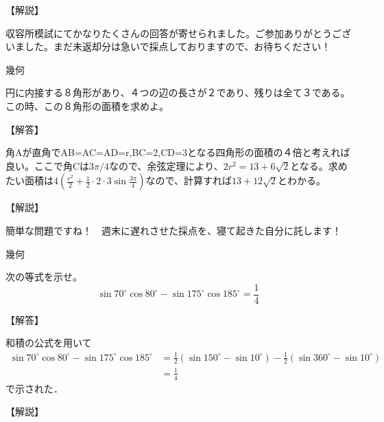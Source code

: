 \documentclass[a4paper,fleqn,dvipdfmx]{jsarticle}
\begin{document}
\begin{flushleft}
【解説】
\end{flushleft}

    収容所模試にてかなりたくさんの回答が寄せられました。ご参加ありがとうございました。まだ未返却分は急いで採点しておりますので、お待ちください！



\newpage


\begin{itembox}[l]{幾何}

    円に内接する８角形があり、４つの辺の長さが２であり、残りは全て３である。この時、この８角形の面積を求めよ。
    
\end{itembox}


\begin{flushleft}
【解答】
\end{flushleft}

    角Aが直角でAB=AC=AD=r,BC=2,CD=3となる四角形の面積の４倍と考えれば良い。ここで角Cは$3\pi/4$なので、余弦定理により、$2r^2=13+6\sqrt{2}$となる。求めたい面積は$4(\frac{r^2}{2}+\frac{1}{2}\cdot 2 \cdot 3 \sin \frac{3\pi}{4})$なので、計算すれば$13+12\sqrt{2}$とわかる。

\begin{flushleft}
【解説】
\end{flushleft}

    簡単な問題ですね！　週末に遅れさせた採点を、寝て起きた自分に託します！



\newpage


\begin{itembox}[l]{幾何}

    次の等式を示せ。
    $$\sin 70 ^{\circ}\cos 80 ^{\circ}-\sin 175 ^{\circ}\cos 185 ^{\circ}=\frac{1}{4}$$
    
\end{itembox}


\begin{flushleft}
【解答】
\end{flushleft}
和積の公式を用いて
\begin{align*}
    \sin 70 ^{\circ}\cos 80 ^{\circ}-\sin 175 ^{\circ}\cos 185 ^{\circ} &= \displaystyle\frac{1}{2}(\sin 150^{\circ}-\sin 10^{\circ})-\displaystyle\frac{1}{2}(\sin 360^{\circ}-\sin 10^{\circ})\\
    &= \displaystyle\frac{1}{4}
\end{align*}
で示された．
\begin{flushleft}
【解説】
\end{flushleft}
\end{document}
